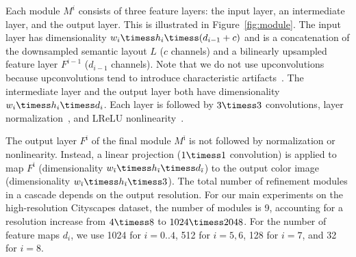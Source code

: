 Each module $M^i$ consists of three feature layers: the input layer, an intermediate layer, and the output layer. This is illustrated in Figure~\ref{fig:module}. The input layer has dimensionality ${w_i \timess h_i \timess (d_{i-1}+c)}$ and is a concatenation of the downsampled semantic layout $L$ ($c$ channels) and a bilinearly upsampled feature layer $F^{i-1}$ ($d_{i-1}$ channels). Note that we do not use upconvolutions because upconvolutions tend to introduce characteristic artifacts~\cite{Odena2016}.
The intermediate layer and the output layer both have dimensionality $w_i \timess h_i \timess d_i$. Each layer is followed by $3\timess 3$ convolutions, layer normalization~\cite{Ba2016}, and LReLU nonlinearity~\cite{Maas2013}.

The output layer $F^{\bar\imath}$ of the final module $M^{\bar\imath}$ is not followed by normalization or nonlinearity. Instead, a linear projection ($1\timess 1$ convolution) is applied to map $F^{\bar\imath}$ (dimensionality ${w_{\bar\imath} \timess h_{\bar\imath} \timess d_{\bar\imath}}$) to the output color image (dimensionality ${w_{\bar\imath} \timess h_{\bar\imath} \timess 3}$).
The total number of refinement modules in a cascade depends on the output resolution. For our main experiments on the high-resolution Cityscapes dataset, the number of modules is 9, accounting for a resolution increase from $4\timess 8$ to $1024 \timess 2048$.
For the number of feature maps $d_i$, we use 1024 for $i = 0..4$, 512 for $i=5,6$, 128 for $i=7$, and 32 for $i=8$.






